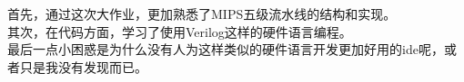 首先，通过这次大作业，更加熟悉了MIPS五级流水线的结构和实现。\\
其次，在代码方面，学习了使用Verilog这样的硬件语言编程。\\
最后一点小困惑是为什么没有人为这样类似的硬件语言开发更加好用的ide呢，或者只是我没有发现而已。
